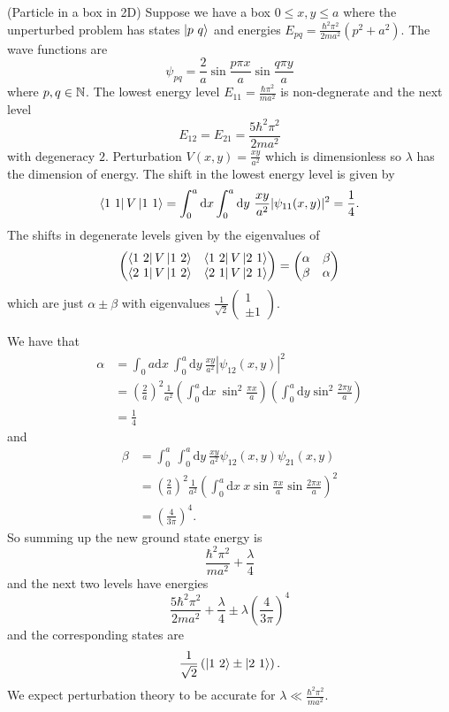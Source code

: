 \documentclass{article}
\begin{document}
\begin{example}
	(Particle in a box in 2D) Suppose we have a box $ 0\le x,y \le a $ where the unperturbed problem has states $ \ket{ p\ q} $ and energies $ E_{pq} = \frac{\hbar^2 \pi^2}{2ma^2} (p^2+a^2) $. The wave functions are
	\[
		\psi_{pq} = \frac 2a \sin\frac{p\pi x}a \sin \frac{q\pi y}a
	\]
	where $ p,q\in \mathbb{N} $. The lowest energy level $ E_{11} =  \frac{\hbar \pi^2}{ma^2}$ is non-degnerate and the next level
	\[
		E_{12} = E_{21} = \frac{5\hbar^2\pi^2}{2ma^2}
	\]
	with degeneracy $ 2 $. Perturbation $ V(x,y) = \frac{xy}{a^2} $ which is dimensionless so $ \lambda $ has the dimension of energy. The shift in the lowest energy level is given by 
	\[
		\bra{1\ 1} V \ket{1\ 1} = \int_0^a \mathrm dx \int_0^a \mathrm dy \ \frac{xy}{a^2} |\psi_{11}(x,y)|^2 = \frac 14.
	\]
	The shifts in degenerate levels given by the eigenvalues of 
	\[
		\begin{pmatrix}
			\bra{1\ 2} V \ket{1\ 2} & \bra{1\ 2}V \ket{2\ 1} \\
			\bra{2\ 1} V \ket{1\ 2} & \bra{2\ 1}V \ket{2\ 1}
		\end{pmatrix} = \begin{pmatrix}
			\alpha & \beta \\
			\beta & \alpha
		\end{pmatrix}
	\]
	which are just $ \alpha \pm \beta $ with eigenvalues $ \frac 1 {\sqrt 2} \begin{pmatrix}
	  1 \\ \pm 1
	\end{pmatrix} $.\par
	We have that 
	\begin{align*}
		\alpha &= \int_0a \mathrm dx \ \int_0^a \mathrm dy \ \frac{xy}{a^2} | \psi_{12}(x,y)|^2 \\
		       &= \left(\frac 2a \right)^2 \frac 1{a^2} \left(\int_0^a \mathrm dx \ \sin^2\frac{\pi x}a\right)\left(\int_0^a \mathrm dy \sin^2 \frac{2\pi y}a \right) \\
		       &= \frac 14
	\end{align*}
	and
	\begin{align*}
		\beta &= \int_0^a \ \int_0^a \mathrm dy \ \frac{xy}{a^2} \psi_{12}(x,y)\psi_{21}(x,y) \\
		      &= \left(\frac 2a\right)^2\frac 1{a^2} \left(\int_0^a \mathrm dx \ x\sin\frac{\pi x}a \sin\frac{2\pi x}a\right)^2 \\
		      &= \left(\frac 4{3\pi}\right)^4.
	\end{align*}
	So summing up the new ground state energy is 
	\[
		\frac{\hbar^2 \pi^2}{ma^2} + \frac \lambda 4
	\]
	and the next two levels have energies
	\[
		\frac{5\hbar^2 \pi^2}{2ma^2} + \frac \lambda 4 \pm \lambda\left(\frac{4}{3\pi}\right)^4
	\]
	and the corresponding states are
	\[
		\frac 1{\sqrt 2} \left( \ket{1 \ 2} \pm \ket{2 \ 1}\right).
	\]
We expect perturbation theory to be accurate for $ \lambda \ll \frac{\hbar^2 \pi^2}{ma^2} $.
\end{example}
\end{document}
